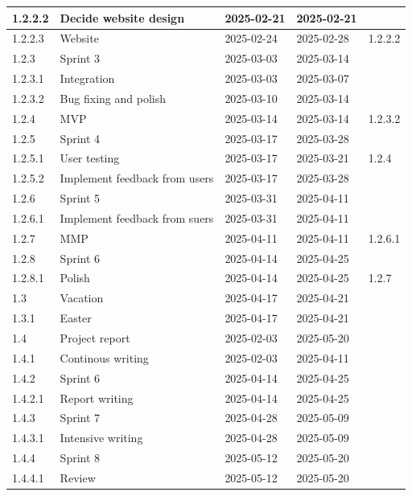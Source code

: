 \begin{table}[H]
\begin{tabular}{|l|l|l|l|l|}
        1.2.2.2 & Decide website design & 2025-02-21 & 2025-02-21 & ~ \\ \hline
        1.2.2.3 & Website & 2025-02-24 & 2025-02-28 & 1.2.2.2 \\ \hline
        1.2.3 & Sprint 3 & 2025-03-03 & 2025-03-14 & ~ \\ \hline
        1.2.3.1 & Integration & 2025-03-03 & 2025-03-07 & ~ \\ \hline
        1.2.3.2 & Bug fixing and polish & 2025-03-10 & 2025-03-14 & ~ \\ \hline
        1.2.4 & MVP & 2025-03-14 & 2025-03-14 & 1.2.3.2 \\ \hline
        1.2.5 & Sprint 4 & 2025-03-17 & 2025-03-28 & ~ \\ \hline
        1.2.5.1 & User testing & 2025-03-17 & 2025-03-21 & 1.2.4 \\ \hline
        1.2.5.2 & Implement feedback from users & 2025-03-17 & 2025-03-28 & ~ \\ \hline
        1.2.6 & Sprint 5 & 2025-03-31 & 2025-04-11 & ~ \\ \hline
        1.2.6.1 & Implement feedback from suers & 2025-03-31 & 2025-04-11 & ~ \\ \hline
        1.2.7 & MMP & 2025-04-11 & 2025-04-11 & 1.2.6.1 \\ \hline
        1.2.8 & Sprint 6 & 2025-04-14 & 2025-04-25 & ~ \\ \hline
        1.2.8.1 & Polish & 2025-04-14 & 2025-04-25 & 1.2.7 \\ \hline
        1.3 & Vacation & 2025-04-17 & 2025-04-21 & ~ \\ \hline
        1.3.1 & Easter & 2025-04-17 & 2025-04-21 & ~ \\ \hline
        1.4 & Project report & 2025-02-03 & 2025-05-20 & ~ \\ \hline
        1.4.1 & Continous writing & 2025-02-03 & 2025-04-11 & ~ \\ \hline
        1.4.2 & Sprint 6 & 2025-04-14 & 2025-04-25 & ~ \\ \hline
        1.4.2.1 & Report writing & 2025-04-14 & 2025-04-25 & ~ \\ \hline
        1.4.3 & Sprint 7 & 2025-04-28 & 2025-05-09 & ~ \\ \hline
        1.4.3.1 & Intensive writing & 2025-04-28 & 2025-05-09 & ~ \\ \hline
        1.4.4 & Sprint 8 & 2025-05-12 & 2025-05-20 & ~ \\ \hline
        1.4.4.1 & Review & 2025-05-12 & 2025-05-20 & ~ \\ \hline

\end{tabular}
\end{table}
